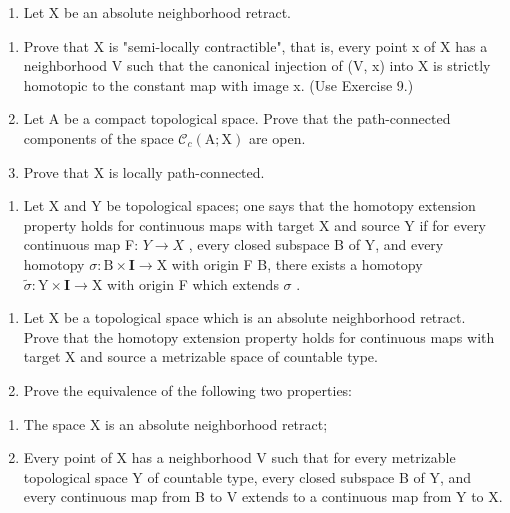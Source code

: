 \begin{enumerate}
\def\labelenumi{\arabic{enumi})}
\setcounter{enumi}{10}
\tightlist
\item
  Let X be an absolute neighborhood retract.
\end{enumerate}

\begin{enumerate}
\def\labelenumi{\alph{enumi})}
\item
  Prove that X is "semi-locally contractible", that is, every point x of X has a neighborhood V such that the canonical injection of (V, x) into X is strictly homotopic to the constant map with image x. (Use Exercise 9.)
\item
  Let A be a compact topological space. Prove that the path-connected components of the space \(\mathcal{C}_{c}(\mathrm{A};\mathrm{X})\) are open.
\item
  Prove that X is locally path-connected.
\end{enumerate}

\begin{enumerate}
\def\labelenumi{\arabic{enumi})}
\setcounter{enumi}{11}
\tightlist
\item
  Let X and Y be topological spaces; one says that the homotopy extension property holds for continuous maps with target X and source Y if for every continuous map F: \(Y \rightarrow X\) , every closed subspace B of Y, and every homotopy \(\sigma\colon\mathrm{B}\times\mathbf{I}\to\mathrm{X}\) with origin F \textbar{} B, there exists a homotopy \(\widetilde{\sigma}\colon\mathrm{Y}\times\mathbf{I}\to\mathrm{X}\) with origin F which extends \(\sigma\) .
\end{enumerate}

\begin{enumerate}
\def\labelenumi{\alph{enumi})}
\item
  Let X be a topological space which is an absolute neighborhood retract. Prove that the homotopy extension property holds for continuous maps with target X and source a metrizable space of countable type.
\item
  Prove the equivalence of the following two properties:
\end{enumerate}

\begin{enumerate}
\def\labelenumi{(\roman{enumi})}
\item
  The space X is an absolute neighborhood retract;
\item
  Every point of X has a neighborhood V such that for every metrizable topological space Y of countable type, every closed subspace B of Y, and every continuous map from B to V extends to a continuous map from Y to X.
\end{enumerate}

